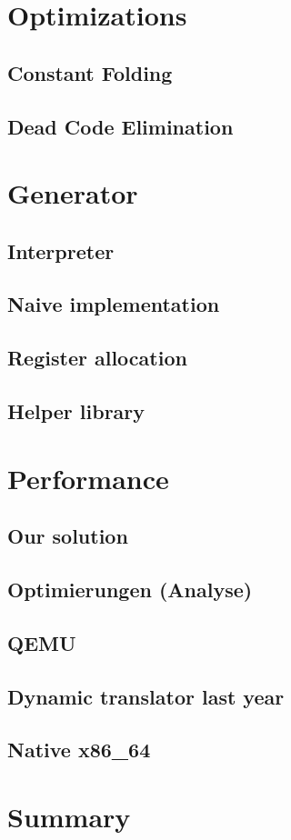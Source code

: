 \documentclass[course=eragp]{aspdoc}
\begin{document}
\section{Optimizations}
\subsection{Constant Folding}\label{constant_folding}

\subsection{Dead Code Elimination}\label{dead_code_elimination}

\clearpage

\section{Generator}
\subsection{Interpreter}
\subsection{Naive implementation}
\subsection{Register allocation}
\subsection{Helper library}\label{helper}

\section{Performance}
\subsection{Our solution}
\subsection{Optimierungen (Analyse)}
\subsection{QEMU}
\subsection{Dynamic translator last year}
\subsection{Native x86\_64}

\section{Summary}


{}
\end{document}
